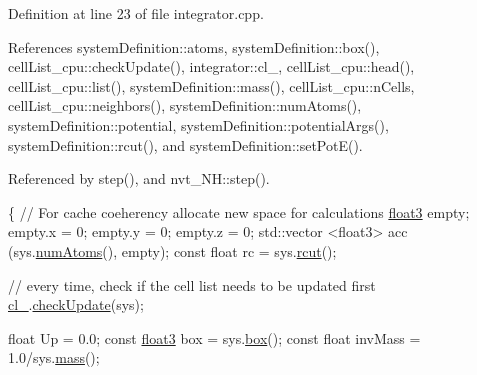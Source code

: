 Definition at line 23 of file integrator.\-cpp.



References system\-Definition\-::atoms, system\-Definition\-::box(), cell\-List\-\_\-cpu\-::check\-Update(), integrator\-::cl\-\_\-, cell\-List\-\_\-cpu\-::head(), cell\-List\-\_\-cpu\-::list(), system\-Definition\-::mass(), cell\-List\-\_\-cpu\-::n\-Cells, cell\-List\-\_\-cpu\-::neighbors(), system\-Definition\-::num\-Atoms(), system\-Definition\-::potential, system\-Definition\-::potential\-Args(), system\-Definition\-::rcut(), and system\-Definition\-::set\-Pot\-E().



Referenced by step(), and nvt\-\_\-\-N\-H\-::step().


\begin{DoxyCode}
                                                 \{
    \textcolor{comment}{// For cache coeherency allocate new space for calculations}
    \hyperlink{structfloat3}{float3} empty;
    empty.x = 0; empty.y = 0; empty.z = 0;
    std::vector <float3> acc (sys.\hyperlink{classsystem_definition_ae8d3c2df2d56241cee03fcc4e2026ae0}{numAtoms}(), empty);
    \textcolor{keyword}{const} \textcolor{keywordtype}{float} rc = sys.\hyperlink{classsystem_definition_acacd88aac7d451bdcf9779ae8c5a95c7}{rcut}();

    \textcolor{comment}{// every time, check if the cell list needs to be updated first}
    \hyperlink{classintegrator_ad1f7813c9cf3c31898aa7d78fc22232a}{cl\_}.\hyperlink{classcell_list__cpu_a70568e6a2012eb8592f2798b3260c550}{checkUpdate}(sys);

    \textcolor{keywordtype}{float} Up = 0.0;
    \textcolor{keyword}{const} \hyperlink{structfloat3}{float3} box = sys.\hyperlink{classsystem_definition_a85b80dee3609ddb68e370cee3fa959ea}{box}();
    \textcolor{keyword}{const} \textcolor{keywordtype}{float} invMass = 1.0/sys.\hyperlink{classsystem_definition_acb6dd3df121e3e5bc0eb41c32bd937bd}{mass}();
    

\end{DoxyCode}
